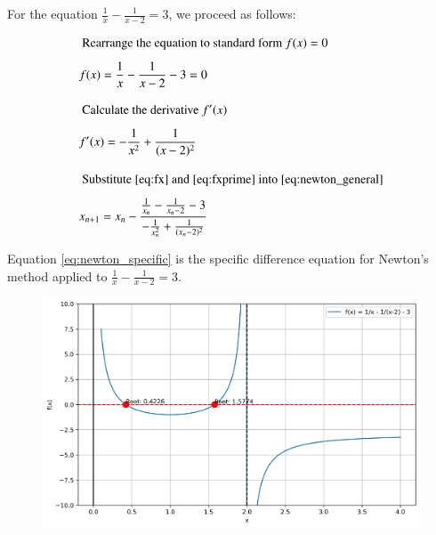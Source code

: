 \documentclass[journal]{IEEEtran}
\begin{document}
For the equation $\frac{1}{x} - \frac{1}{x-2} = 3$, we proceed as follows:

\begin{align}
    &\text{ Rearrange the equation to standard form } f(x) = 0 \nonumber \\[1ex]
    &f(x) = \frac{1}{x} - \frac{1}{x-2} - 3 = 0 \label{eq:fx} \\[2ex]
    &\text{ Calculate the derivative } f'(x) \nonumber \\[1ex]
    &f'(x) = -\frac{1}{x^2} + \frac{1}{(x-2)^2} \label{eq:fxprime} \\[2ex]
    &\text{ Substitute \eqref{eq:fx} and \eqref{eq:fxprime} into \eqref{eq:newton_general}} \nonumber \\[1ex]
    &x_{n+1} = x_n - \frac{\frac{1}{x_n} - \frac{1}{x_n-2} - 3}{-\frac{1}{x_n^2} + \frac{1}{(x_n-2)^2}} \label{eq:newton_specific}
\end{align}

Equation \eqref{eq:newton_specific} is the specific difference equation for Newton's method applied to $\frac{1}{x} - \frac{1}{x-2} = 3$.

\begin{figure}[h]
    \centering
    \includegraphics[width=\textwidth]{figs/fig.png}
\end{figure}
\end{document}

